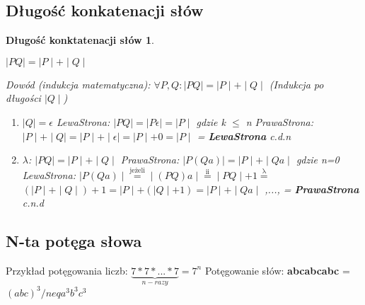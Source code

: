 \subsection{Długość konkatenacji słów}

\newtheorem*{theorem14*}{Długość konktatenacji słów}
	\begin{theorem14*}
	\begin{center}
	$\mid PQ \mid = \mid P \mid + \mid Q \mid$
	\end{center}
	
	Dowód (indukcja matematyczna):\newline
	$\forall P,Q: \mid PQ \mid = \mid P \mid + \mid Q \mid$ (Indukcja po długości $\mid Q \mid$)
	
	\begin{enumerate}[label=(\roman*)]
		\item $\mid Q \mid = \epsilon$ \newline
		LewaStrona: $\mid PQ \mid = \mid P \epsilon \mid = \mid P \mid$ gdzie k $ \leq $ n \newline
		PrawaStrona: $\mid P \mid + \mid Q \mid = 
		\mid P \mid + \mid \epsilon \mid = 
		\mid P \mid+ 0 = \mid P \mid $ = { \bf LewaStrona} c.d.n \newline
		  
		  
		\item  $\lambda$: $\mid PQ \mid = \mid P \mid + \mid Q \mid $ \newline
		PrawaStrona: $\mid P(Qa) \mid = \mid P \mid  + \mid Qa \mid$  gdzie n=0\newline
		LewaStrona: $ \mid P(Qa) \mid \overset{\mathrm{jeżeli}}{=} 
		\mid (PQ)a \mid \overset{\mathrm{ii}}{=} 
		\mid PQ \mid + 1 \overset{\mathrm{\lambda}}{=}$ \newline
		$(\mid P \mid + \mid Q \mid) + 1 = 
		\mid P \mid + (\mid Q \mid + 1) = 
		\mid P \mid + \mid Qa \mid$ ,..., = { \bf  PrawaStrona } c.n.d
	
	\end{enumerate} 
\end{theorem14*}



\subsection{N-ta potęga słowa}
Przykład potęgowania liczb: \textbf{$ \underbrace{7*7* ... *7}_{n-razy} = 7^{n}$}\newline
Potęgowanie słów: \textbf{abcabcabc} = $(abc)^{3} /neq a^{3}b^{3}c^{3}$

